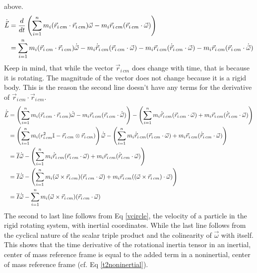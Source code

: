 \documentclass[10pt]{article}
\begin{document}
above.
\begin{align}
    \dot{\vec{L}} &= \frac{d}{dt}
        \left(\sum_{i=1}^n 
        m_i(\vec{r}_{i\,cm}\cdot\vec{r}_{i\,cm})\vec{\omega} - 
        m_i\vec{r}_{i\,cm}(\vec{r}_{i\,cm}\cdot\vec{\omega})\right) \\
    &=\sum_{i=1}^n 
        m_i(\vec{r}_{i\,cm}\cdot\vec{r}_{i\,cm})\dot{\vec{\omega}} - 
        m_i\dot{\vec{r}}_{i\,cm}(\vec{r}_{i\,cm}\cdot\vec{\omega}) -
        m_i\vec{r}_{i\,cm}(\dot{\vec{r}}_{i\,cm}\cdot\vec{\omega}) -
        m_i\vec{r}_{i\,cm}(\vec{r}_{i\,cm}\cdot\dot{\vec{\omega}}) \notag
\end{align}
Keep in mind, that while the vector $\vec{r}_{i\,cm}$ does change with time, 
that is because it is rotating. The magnitude of the vector does not change 
because it is a rigid body. This is the reason the second line 
doesn't have any terms for the derivative of 
$\vec{r}_{i\,cm}\cdot\vec{r}_{i\,cm}$. 
\begin{align}
    \dot{\vec{L}}&=\left(\sum_{i=1}^n 
        m_i(\vec{r}_{i\,cm}\cdot\vec{r}_{i\,cm})\dot{\vec{\omega}} - 
        m_i\vec{r}_{i\,cm}(\vec{r}_{i\,cm}\cdot\dot{\vec{\omega}})\right) -
    \left(\sum_{i=1}^n 
        m_i\dot{\vec{r}}_{i\,cm}(\vec{r}_{i\,cm}\cdot\vec{\omega}) +
        m_i\vec{r}_{i\,cm}(\dot{\vec{r}}_{i\,cm}\cdot\vec{\omega})\right) 
        \notag\\
    &=\left(\sum_{i=1}^n m_i (r^2_{i\,cm}\mathbb{I} - 
        \vec{r}_{i\,cm}\otimes\vec{r}_{i\,cm})\right)\dot{\vec{\omega}}-
    \left(\sum_{i=1}^n 
        m_i\dot{\vec{r}}_{i\,cm}(\vec{r}_{i\,cm}\cdot\vec{\omega}) +
        m_i\vec{r}_{i\,cm}(\dot{\vec{r}}_{i\,cm}\cdot\vec{\omega})\right) 
        \notag\\
    &=\overline{I}\dot{\vec{\omega}}-
    \left(\sum_{i=1}^n 
        m_i\dot{\vec{r}}_{i\,cm}(\vec{r}_{i\,cm}\cdot\vec{\omega}) +
        m_i\vec{r}_{i\,cm}(\dot{\vec{r}}_{i\,cm}\cdot\vec{\omega})\right) 
        \notag\\
    &=\overline{I}\dot{\vec{\omega}}-
        \left(\sum_{i=1}^n 
        m_i(\vec{\omega}\times\vec{r}_{i\,cm})
        (\vec{r}_{i\,cm}\cdot\vec{\omega}) +
        m_i\vec{r}_{i\,cm}((\vec{\omega}\times\vec{r}_{i\,cm})
        \cdot\vec{\omega})\right) \notag\\
    &=\overline{I}\dot{\vec{\omega}}-
        \sum_{i=1}^n 
        m_i(\vec{\omega}\times\vec{r}_{i\,cm})
        (\vec{r}_{i\,cm}\cdot\vec{\omega})
\end{align}
The second to last line follows from Eq \ref{vcircle}, 
the velocity of a particle in the rigid rotating system, with inertial 
coordinates. While the last line follows from 
the cyclical nature of the scalar triple product and the colinearity of 
$\vec{\omega}$ with itself. This shows that the time 
derivative of the rotational inertia tensor in an inertial, center of mass 
reference frame is equal to the added term in a noninertial, center of 
mass reference frame (cf. Eq \ref{t2noninertial}).
\end{document}
